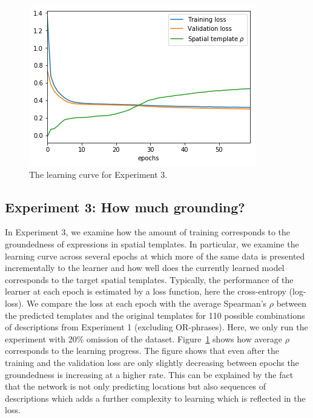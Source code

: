 \begin{figure}
	\centering
	\begin{minipage}[b]{0.7\linewidth}
	    \centering
	    \includegraphics[width=0.75\linewidth]{studies/iwcs2017/experiment3/learning_curve.png}
	    \caption{\label{iwcs2017:fig:exp3:learning} The learning curve for Experiment 3.}
	\end{minipage}%
\end{figure}

\subsection{Experiment 3: How much grounding?}

In Experiment 3, we examine how the amount of training corresponds to the
groundedness of expressions in spatial templates. In particular, we examine the
learning curve across several epochs at which more of the same data is presented
incrementally to the learner and how well does the currently learned model
corresponds to the target spatial templates. Typically, the
performance of the learner at each epoch is estimated by a loss function, here the
cross-entropy (log-loss). We compare the loss at each epoch with the
average Spearman's $\rho$ between the predicted templates and the original
templates for 110 possible combinations of descriptions
from Experiment 1 (excluding OR-phrases). Here, we only run the experiment with 20\% omission of the
dataset. Figure~\ref{iwcs2017:fig:exp3:learning} shows how average $\rho$ corresponds to
the learning progress. The figure shows that even after the training and the validation loss are only slightly decreasing between epochs the groundedness is increasing at a higher rate. This can be explained by the fact that the network is not only predicting locations but also sequences of descriptions which adds a further complexity to learning which is reflected in the loss.


